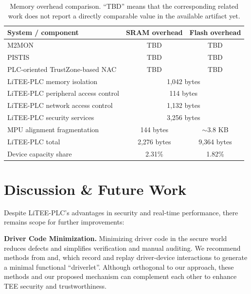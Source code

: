 \documentclass[sigconf]{acmart}
\begin{document}
\begin{table}[t]
\centering
\caption{Memory overhead comparison. ``TBD'' means that the corresponding related work does not report a directly comparable value in the available artifact yet.}
\label{tab:storage_overhead_revised}
\footnotesize
\begin{tabular}{lcc}
\toprule
\textbf{System / component} & \textbf{SRAM overhead} & \textbf{Flash overhead} \\
\midrule
M2MON & TBD & TBD \\
PISTIS & TBD & TBD \\
PLC-oriented TrustZone-based NAC & TBD & TBD \\
\midrule
LiTEE-PLC memory isolation & \multicolumn{2}{c}{1,042 bytes} \\
LiTEE-PLC peripheral access control & \multicolumn{2}{c}{114 bytes} \\
LiTEE-PLC network access control & \multicolumn{2}{c}{1,132 bytes} \\
LiTEE-PLC security services & \multicolumn{2}{c}{3,256 bytes} \\
MPU alignment fragmentation & 144 bytes & $\sim$3.8 KB \\
\midrule
LiTEE-PLC total & 2,276 bytes & 9,364 bytes \\
Device capacity share & 2.31\% & 1.82\% \\
\bottomrule
\end{tabular}
\end{table}



\section{Discussion \& Future Work}
\label{chap8}
Despite LiTEE-PLC’s  advantages in security and real-time performance, there remains scope for further improvements:

\textbf{Driver Code Minimization.} Minimizing driver code in the secure world reduces defects and simplifies  verification and manual auditing. We recommend methods from\cite{guo2022minimum} and\cite{wang2022rt-tee}, which record and replay driver-device interactions to generate a minimal functional ``driverlet''. Although orthogonal to our approach, these methods and our proposed mechanism can complement each other to enhance TEE security and trustworthiness.
\end{document}

